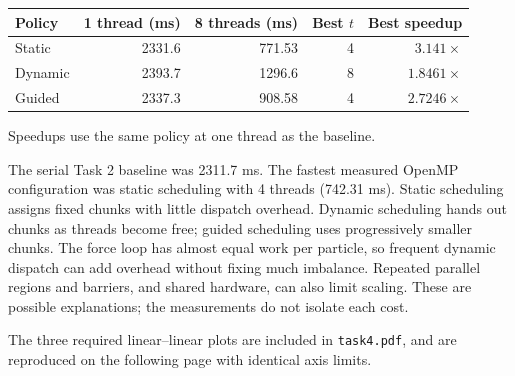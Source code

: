 \documentclass[a4paper]{article}
\begin{document}
\begin{center}\begin{tabular}{lrrrr}\hline
Policy & 1 thread (ms) & 8 threads (ms) & Best $t$ & Best speedup \\ \hline
Static & 2331.6 & 771.53 & 4 & $3.141\times$ \\
Dynamic & 2393.7 & 1296.6 & 8 & $1.8461\times$ \\
Guided & 2337.3 & 908.58 & 4 & $2.7246\times$ \\
\hline\end{tabular}\end{center}
{\small Speedups use the same policy at one thread as the baseline.}


The serial Task 2 baseline was 2311.7 ms. The fastest measured OpenMP configuration was static scheduling with 4 threads (742.31 ms). Static scheduling assigns fixed chunks with little dispatch overhead. Dynamic scheduling hands out chunks as threads become free; guided scheduling uses progressively smaller chunks. The force loop has almost equal work per particle, so frequent dynamic dispatch can add overhead without fixing much imbalance. Repeated parallel regions and barriers, and shared hardware, can also limit scaling. These are possible explanations; the measurements do not isolate each cost.

The three required linear--linear plots are included in \texttt{task4.pdf}, and are reproduced on the following page with identical axis limits.
\newpage
\end{document}
